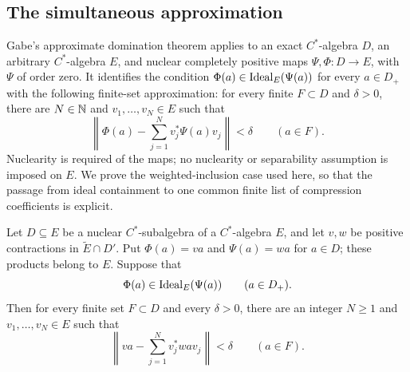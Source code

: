 \subsection{The simultaneous approximation}

Gabe's approximate domination theorem
\cite[Definition~3.1 and Theorem~3.3]{Gabe2020} applies to an exact
$C^*$-algebra $D$, an arbitrary $C^*$-algebra $E$, and nuclear
completely positive maps $\Psi,\Phi:D\to E$, with $\Psi$ of order
zero.  It identifies the condition
$\Phi(a)\in\operatorname{Ideal}_E(\Psi(a))$ for every $a\in D_+$ with the
following finite-set approximation: for every finite $F\subset D$
and $\delta>0$, there are $N\in\mathbb N$ and $v_1,\ldots,v_N\in E$
such that
\begin{equation}\label{cen:domination-equation}
 \left\|\Phi(a)-\sum_{j=1}^Nv_j^*\Psi(a)v_j\right\|<\delta
\qquad(a\in F).
\end{equation}
Nuclearity is required of the maps; no nuclearity or separability
assumption is imposed on $E$.  We prove the weighted-inclusion case
used here, so that the passage from ideal containment to one common
finite list of compression coefficients is explicit.

\begin{lemma}
\label{cen:weighted-domination}
Let $D\subseteq E$ be a nuclear $C^*$-subalgebra of a $C^*$-algebra
$E$, and let $v,w$ be positive contractions in $\widetilde E\cap D'$.
Put $\Phi(a)=va$ and $\Psi(a)=wa$ for $a\in D$; these products
belong to $E$. Suppose that
\[
 \Phi(a)\in\operatorname{Ideal}_E(\Psi(a))\qquad(a\in D_+).
\]
Then for every finite set $F\subset D$ and every $\delta>0$, there
are an integer $N\ge1$ and $v_1,\ldots,v_N\in E$ such that
\[
 \left\|va-\sum_{j=1}^N v_j^*wa v_j\right\|<\delta
 \qquad(a\in F).
\]
\end{lemma}

